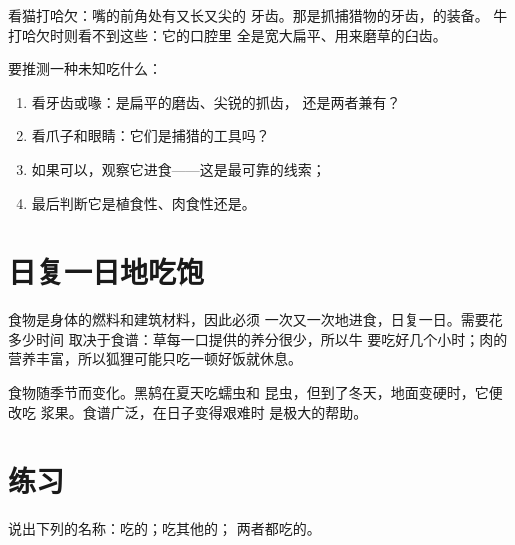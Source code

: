 \begin{example}[猫的牙齿]\label{ex:g2:what-animals-eat:cat}
看猫打哈欠：嘴的前角处有又长又尖的
牙齿。那是抓捕猎物的牙齿，的装备。
牛打哈欠时则看不到这些：它的口腔里
全是宽大扁平、用来磨草的臼齿。
\end{example}

\begin{method}[推测食谱]\label{met:g2:what-animals-eat:guess}
要推测一种未知吃什么：
\begin{enumerate}
  \item 看牙齿或喙：是扁平的磨齿、尖锐的抓齿，
        还是两者兼有？
  \item 看爪子和眼睛：它们是捕猎的工具吗？
  \item 如果可以，观察它进食——这是最可靠的线索；
  \item 最后判断它是植食性、肉食性还是。
\end{enumerate}
\end{method}

\section{日复一日地吃饱}

\begin{proposition}[进食是每日的任务]\label{prop:g2:what-animals-eat:daily}
食物是身体的燃料和建筑材料，因此必须
一次又一次地进食，日复一日。需要花多少时间
取决于食谱：草每一口提供的养分很少，所以牛
要吃好几个小时；肉的营养丰富，所以狐狸可能只吃一顿好饭就休息。
\end{proposition}
\admitted

\begin{example}[冬天的食谱变化]\label{ex:g2:what-animals-eat:winter}
食物随季节而变化。黑鸫在夏天吃蠕虫和
昆虫，但到了冬天，地面变硬时，它便改吃
浆果。食谱广泛，在日子变得艰难时
是极大的帮助。
\end{example}

\section{练习}

\begin{exercise}[$\star$]\label{exo:g2:what-animals-eat:1}
说出下列的名称：吃的；吃其他的；
两者都吃的。
\end{exercise}

